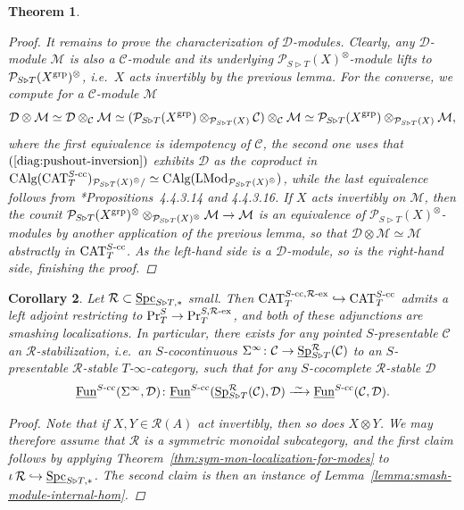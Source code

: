 \documentclass[reqno]{memo-l}
\theoremstyle{mythm}
\newtheorem{thm}{Theorem}[section]
\newtheorem{cor}[thm]{Corollary}
\theoremstyle{definition}
\numberwithin{equation}{section}
\newcommand{\Cc}{{\mathcal{C}}}
\newcommand{\Dd}{{\mathcal{D}}}
\newcommand{\Mm}{{\mathcal{M}}}
\newcommand{\Rr}{{\mathcal R}}
\DeclareMathOperator{\Sp}{Sp}
\DeclareMathOperator{\Spc}{Spc}
\DeclareMathOperator{\CAT}{CAT}
\newcommand{\Fun}{{\textup{Fun}}}
\DeclareMathOperator{\core}{\iota}
\DeclareMathOperator{\CAlg}{\textup{CAlg}}
\renewcommand{\Pr}{\textup{Pr}}
\newcommand{\ulhelper}[2]{\underline{\setbox0=\hbox{$#1#2$}\dp0=0.4pt \box0\relax}}
\newcommand{\ul}[1]{{\mathpalette\ulhelper{#1}}\hbox{\rule[-2pt]{0pt}{0pt}}}
\newcommand{\iso}{\xrightarrow{\;\smash{\raisebox{-0.25ex}{\ensuremath{\scriptstyle\sim}}}\;}}
\newcommand{\grp}{\textup{grp}}
\begin{document}
\begin{thm}
\begin{proof}
        It remains to prove the characterization of $\Dd$-modules. Clearly, any $\Dd$-module $\Mm$ is also a $\Cc$-module and its underlying $\mathcal P_{S\triangleright T}(X)^{\otimes}$-module lifts to $\mathcal P_{S\triangleright T}(X^{\grp})^{\otimes}$, i.e.~$X$ acts invertibly by the previous lemma. For the converse, we compute for a $\Cc$-module $\Mm$
        \[
            \Dd\otimes\Mm\simeq\Dd\otimes_\Cc\Mm\simeq(\mathcal P_{S\triangleright T}(X^{\grp})\otimes_{\mathcal P_{S\triangleright T}(X)} \Cc)\otimes_\Cc\Mm\simeq \mathcal P_{S\triangleright T}(X^{\grp})\otimes_{\mathcal P_{S\triangleright T}(X)}\Mm,
        \]
        where the first equivalence is idempotency of $\Cc$, the second one uses that $(\ref{diag:pushout-inversion})$ exhibits $\Dd$ as the coproduct in $\CAlg(\CAT_T^\textup{$S$-cc})_{\mathcal P_{S\triangleright T}(X)^{\otimes}/}\simeq\CAlg(\text{LMod}_{\mathcal P_{S\triangleright T}(X)^{\otimes}})$, while the last equivalence follows from \cite{HA}*{Propositions~4.4.3.14 and 4.4.3.16}. If $X$ acts invertibly on $\Mm$, then the counit $\mathcal P_{S\triangleright T}(X^{\grp})^{\otimes}\otimes_{\mathcal P_{S\triangleright T}(X)^{\otimes}}\Mm\to\Mm$ is an equivalence of $\mathcal P_{S\triangleright T}(X)^{\otimes}$-modules by another application of the previous lemma, so that $\Dd\otimes\Mm\simeq\Mm$ abstractly in $\CAT_T^\textup{$S$-cc}$. As the left-hand side is a $\Dd$-module, so is the right-hand side, finishing the proof.
    \end{proof}
\end{thm}

\begin{cor}\label{cor:stabilization-exists}
    Let $\Rr\subset\smash{\ul\Spc_{S\triangleright T,*}}$ small. Then $\smash{\CAT_T^{S\textup{-cc},\textup{$\Rr$-ex}}}\hookrightarrow\CAT_T^\textup{$S$-cc}$ admits a left adjoint restricting to $\Pr^S_T\to\Pr^{S,\textup{$\Rr$-ex}}_T$, and both of these adjunctions are smashing localizations. In particular, there exists for any pointed $S$-presentable $\Cc$ an \emph{$\bm\Rr$-stabilization}, i.e.\ an $S$-cocontinuous $\Sigma^\infty\colon\Cc\to\ul\Sp^\Rr_{S\triangleright T}(\Cc)$ to an $S$-presentable $\Rr$-stable $T$-$\infty$-category, such that for any $S$-cocomplete $\Rr$-stable $\Dd$
    \[
        \ul\Fun^\textup{$S$-cc}(\Sigma^\infty,\Dd)\colon\ul\Fun^\textup{$S$-cc}(\ul\Sp^\Rr_{S\triangleright T}(\Cc),\Dd)\iso\ul\Fun^\textup{$S$-cc}(\Cc,\Dd).
    \]
    \begin{proof}
        Note that if $X,Y\in\Rr(A)$ act invertibly, then so does $X\otimes Y$. We may therefore assume that $\Rr$ is a symmetric monoidal subcategory, and the first claim follows by applying Theorem~\ref{thm:sym-mon-localization-for-modes} to $\core\Rr\hookrightarrow\ul\Spc_{S\triangleright T,*}$. The second claim is then an instance of Lemma~\ref{lemma:smash-module-internal-hom}.
    \end{proof}
\end{cor}
\end{document}
